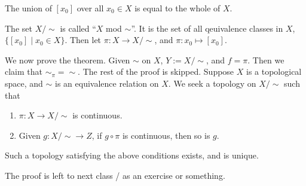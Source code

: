 \begin{simplelemma}
    The union of $[x_0]$ over all $x_0 \in X$ is equal to the whole of $X$.
\end{simplelemma}
\begin{definition}
    The set $X/\sim$ is called ``$X$ mod $\sim$''. It is the set of all qeuivalence classes in $X$, $\{[x_0] \mid x_0 \in X\}$. Then let $\pi : X \to X/\sim$, and $\pi : x_0 \mapsto [x_0]$.
\end{definition}
\noindent We now prove the theorem. Given $\sim$ on $X$, $Y := X/\sim$, and $f = \pi$. Then we claim that $\sim_\pi = \sim$. The rest of the proof is skipped.
\medskip\newline
\noindent Suppose $X$ is a topological space, and $\sim$ is an equivalence relation on $X$. We seek a topology on $X/\sim$ such that
\begin{enumerate}[label=(\alph*)]
    \item $\pi : X \to X/\sim$ is continuous.
    \item Given $g : X/\sim \to Z$, if $g \circ \pi$ is continuous, then so is $g$.
\end{enumerate}
\begin{simplethm}
    Such a topology satisfying the above conditions exists, and is unique.
\end{simplethm}
\noindent The proof is left to next class / as an exercise or something.
